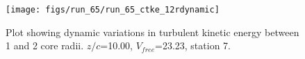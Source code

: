 \begin{figure}[H]
\centering
\texttt{[image: figs/run\_65/run\_65\_ctke\_12rdynamic]}
\caption{Plot showing dynamic variations in turbulent kinetic energy between 1 and 2 core radii. $z/c$=10.00, $V_{free}$=23.23, station 7.}
\end{figure}


